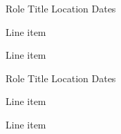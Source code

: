 

\begin{cventries}

  \cventry
    {Role} %
    {Title} %
    {Location} %
    {Dates} %
    {
      \begin{cvitems} %
        \item {Line item}
        \item {Line item}
      \end{cvitems}
    }

  \cventry
    {Role} %
    {Title} %
    {Location} %
    {Dates} %
    {
        \begin{cvitems} %
        \item {Line item}
        \item {Line item}
        \end{cvitems}
    }


\end{cventries}
